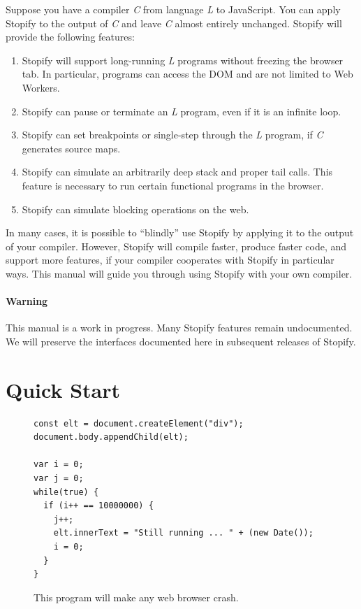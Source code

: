 \documentclass[10pt]{book}
\begin{document}
Suppose you have a compiler \emph{C} from language \emph{L} to JavaScript. You
can apply Stopify to the output of \emph{C} and leave \emph{C} almost entirely
unchanged. Stopify will provide the following features:

\begin{enumerate}

\item Stopify will support long-running \emph{L} programs without freezing the
browser tab. In particular, programs can access the DOM and are not limited to
Web Workers.

\item Stopify can pause or terminate an \emph{L} program, even if it is an
infinite loop.

\item Stopify can set breakpoints or single-step through the \emph{L} program,
if \emph{C} generates source maps.

\item Stopify can simulate an arbitrarily deep stack and proper tail calls.
This feature is necessary to run certain functional programs in the browser.

\item Stopify can simulate blocking operations on the web.

\end{enumerate}

In many cases, it is possible to ``blindly'' use Stopify by applying it to the
output of your compiler. However, Stopify will compile faster, produce faster
code, and support more features, if your compiler cooperates with Stopify in
particular ways. This manual will guide you through using Stopify with your own
compiler.

\paragraph{Warning} This manual is a work in progress. Many Stopify features
remain undocumented. We will preserve the interfaces documented here in
subsequent releases of Stopify.

\section{Quick Start}\label{quickstart}

\begin{figure}
\lstset{language=js}
\begin{lstlisting}
const elt = document.createElement("div");
document.body.appendChild(elt);

var i = 0;
var j = 0;
while(true) {
  if (i++ == 10000000) {
    j++;
    elt.innerText = "Still running ... " + (new Date());
    i = 0;
  }
}
\end{lstlisting}
\caption{This program will make any web browser crash.\label{trivial-periodic}}
\end{figure}
\end{document}
